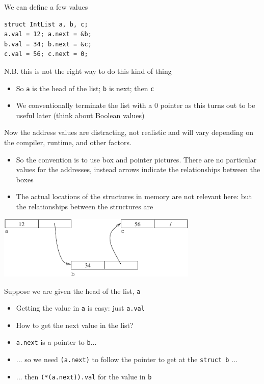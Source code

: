 \documentclass{beamer}
\def\code#1{{\ifmmode\else\large\fi\tt#1}}
\begin{document}
\begin{frame}[fragile]
We can define a few values
\bigskip
\begin{block}{}
\begin{lstlisting}
struct IntList a, b, c;
a.val = 12; a.next = &b;
b.val = 34; b.next = &c;
c.val = 56; c.next = 0;
\end{lstlisting}
\end{block}
\bigskip
N.B. this is not the right way to do this kind of thing
\begin{itemize}
\item So \code{a} is the head of the list; \code{b} is next; then \code{c}
\item We conventionally terminate the list with a 0 pointer as this turns out to be useful later (think about Boolean values)
\end{itemize}
\end{frame}

\begin{frame}[fragile]
Now the address values are distracting, not realistic and will vary depending on the compiler, runtime, and other factors.
\bigskip
\begin{itemize}
\item So the convention is to use box and pointer pictures. There are no particular values for the addresses, instead arrows indicate the relationships between the boxes
\item The actual locations of the structures in memory are not relevant here: but the relationships between the structures are
\end{itemize}
\begin{center}
\includegraphics[height=3cm, keepaspectratio]{Pics/clist2}
\end{center}
\end{frame}

\begin{frame}[fragile]
Suppose we are given the head of the list, \code{a}
\bigskip
\begin{itemize}
\item Getting the value in \code{a} is easy: just \code{a.val}
\item How to get the next value in the list?
\item \code{a.next} is a pointer to \code{b}...
\item ... so we need \code{*(a.next)} to follow the pointer to get at the \code{struct b} ...
\item ... then \code{(*(a.next)).val} for the value in \code{b}
\end{itemize}
\end{frame}
\end{document}
